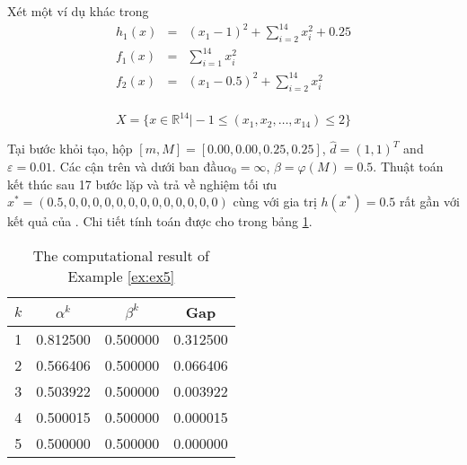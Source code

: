 \begin{vd} Xét một ví dụ khác trong \cite{example4}
\label{ex:ex5}
\[
\begin{array}{ccl}
    h_1(x) & = & \left(x_1-1\right)^2+\displaystyle\sum_{i=2}^{14} x_i^2+0.25\\
     f_{1}(x) & = &\displaystyle\sum_{i=1}^{14} x_i^2\\
    f_{2}(x) & = & \left(x_1-0.5\right)^2+\sum_{i=2}^{14} x_i^2\\
\end{array}
\]

\[
    X =\{ x \in \mathbb{R}^{14} \vert -1 \leq\left(x_1, x_2, \ldots, x_{14}\right) \leq 2 \}
\]
\end{vd}
Tại bước khỏi tạo, hộp  $[m,M] =[0.00,0.00,0.25,0.25]$, $\hat{d}=(1, 1)^{T}$ and $\varepsilon=0.01$. Các cận trên và dưới ban đầu$\alpha_{0}=\infty$, $\beta=\varphi(M)=0.5$.
Thuật toán kết thúc sau 17 bước lặp và trả về nghiệm tối ưu $x^{*}=(0.5, 0,0,0,0,0,0,0,0,0,0,0,0,0)$ cùng với gia trị $h(x^{*})=0.5$ rất gần với kết quả của \cite{example4}. Chi tiết tính toán được cho trong bảng \ref{tab:ex5}.
\begin{table}[h]
\centering{}\caption{\label{tab:ex5}The computational result of Example \ref{ex:ex5}}
\begin{centering}
\begin{tabular}{cccc}
\hline 
$k$  & $\alpha^{k}$ & $\beta^{k}$ & Gap\tabularnewline
\hline 
\hline 
1  & 0.812500 & 0.500000 & 0.312500\tabularnewline
\hline 
2  & 0.566406 & 0.500000 & 0.066406\tabularnewline
\hline 
3  & 0.503922 &0.500000 & 0.003922\tabularnewline
\hline 
4  & 0.500015 & 0.500000 & 0.000015\tabularnewline
\hline 
5  & 0.500000 &0.500000 & 0.000000\tabularnewline
\hline 
\end{tabular}
\par\end{centering}
\end{table}

